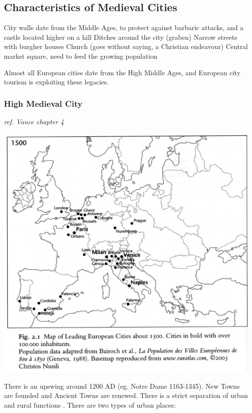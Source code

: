\documentclass{article}
\newcommand{\alignedmarginpar}[1]{%
        \marginpar{\raggedright\small #1}
    }
\begin{document}
\subsection{Characteristics of Medieval Cities}

\begin{outline}
	\1 City walls date from the Middle Ages, to protect against barbaric attacks, and a castle located higher on a hill
	\1 Ditches around the city (graben)
	\1 Narrow streets with burgher houses
	\1 Church (goes without saying, a Christian endeavour)
	\1 Central market square, need to feed the growing population
\end{outline}

Almost all European cities date from the High Middle Ages, and European city tourism is exploiting these legacies.

\subsubsection{High Medieval City}

\textit{ref. Vance chapter 4}

\includegraphics[width=\textwidth]{leading_cities_1500}

There is an upswing around 1200 AD (eg. Notre Dame 1163-1345). New Towns are founded and Ancient Towns are renewed. There is a strict separation of urban and rural functions\alignedmarginpar{ref. Max Weber}. There are two types of urban places:
\end{document}
